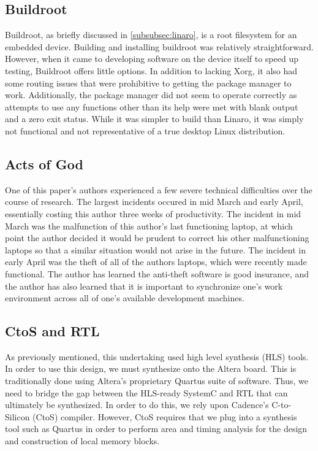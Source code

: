 \documentclass{sig-alternate-10pt}
\begin{document}
\subsection{Buildroot}
Buildroot, as briefly discussed in \ref{subsubsec:linaro}, is a root filesystem for an embedded device. Building and installing buildroot was relatively straightforward. However, when it came to developing software on the device itself to speed up testing, Buildroot offers little options. In addition to lacking Xorg, it also had some routing issues that were prohibitive to getting the package manager to work. Additionally, the package manager did not seem to operate correctly as attempts to use any functions other than its help were met with blank output and a zero exit status. While it was simpler to build than Linaro, it was simply not functional and not representative of a true desktop Linux distribution.

\subsection{Acts of God}
One of this paper's authors experienced a few severe technical difficulties over the course of research. The largest incidents occured in mid March and early April, essentially costing this author three weeks of productivity. The incident in mid March was the malfunction of this author's last functioning laptop, at which point the author decided it would be prudent to correct his other malfunctioning laptops so that a similar situation would not arise in the future. The incident in early April was the theft of all of the authors laptops, which were recently made functional. The author has learned the anti-theft software is good insurance, and the author has also learned that it is important to synchronize one's work environment across all of one's available development machines.

\subsection{CtoS and RTL}
As previously mentioned, this undertaking used high level synthesis (HLS)
tools.  In order to use this design, we must synthesize onto the Altera
board.  This is traditionally done using Altera's proprietary Quartus suite
of software.  Thus, we need to bridge the gap between the HLS-ready SystemC
and RTL that can ultimately be synthesized.  In order to do this, we rely
upon Cadence's C-to-Silicon (CtoS) compiler.  However, CtoS requires that we
plug into a synthesis tool such as Quartus in order to perform area and
timing analysis for the design and construction of local memory blocks.
\end{document}
